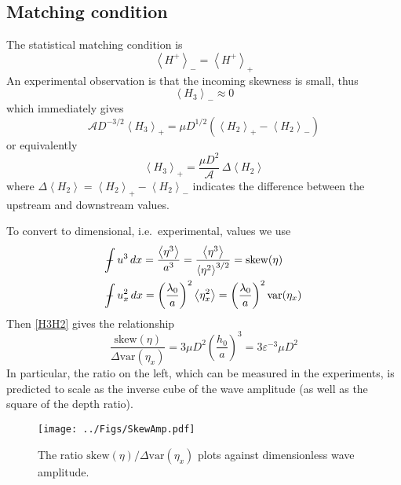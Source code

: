 \documentclass[11pt]{article}
\newcommand{\mean}[1]{\left< #1 \right>}
\newcommand{\eps}{\varepsilon}
\newcommand{\skw}{\text{skew}}
\newcommand{\var}{\text{var}}
\newcommand{\ampp}{\mathcal{A}}
\newcommand{\Ham}{H}
\newcommand{\Hp}{\Ham^{+}}
\newcommand{\meanup}[1]{\mean{#1}_{-}}
\newcommand{\meandn}[1]{\mean{#1}_{+}}
\def\Xint#1{\mathchoice
   {\XXint\displaystyle\textstyle{#1}}%
   {\XXint\textstyle\scriptstyle{#1}}%
   {\XXint\scriptstyle\scriptscriptstyle{#1}}%
   {\XXint\scriptscriptstyle\scriptscriptstyle{#1}}%
   \!\int}
\def\XXint#1#2#3{{\setbox0=\hbox{$#1{#2#3}{\int}$}
     \vcenter{\hbox{$#2#3$}}\kern-.5\wd0}}
\def\dashint{\Xint-}
\newcommand{\intt}{\dashint}%
\newcommand{\dx}{\, dx}
\begin{document}
\subsection{Matching condition}

The statistical matching condition is
\begin{equation}
\meanup{\Hp} = \meandn{\Hp}
\end{equation}
An experimental observation is that the incoming skewness is small, thus
\begin{equation}
\meanup{H_3} \approx 0
\end{equation}
which immediately gives
\begin{equation}
\ampp D^{-3/2} \meandn{H_3} = \mu D^{1/2} \left( \meandn{H_2} - \meanup{H_2} \right)
\end{equation}
or equivalently
\begin{equation}
\label{H3H2}
\meandn{H_3} = \frac{\mu D^{2}}{\ampp} \, \Delta \mean{H_2}
\end{equation}
where $\Delta \mean{H_2} =  \meandn{H_2} - \meanup{H_2}$  indicates the difference between the upstream and downstream values.

To convert to dimensional, i.e.~experimental, values we use
\begin{align}
& \intt u^3 \dx = \frac{\mean{\eta^3}}{a^3} = 
\frac{\mean{\eta^3}}{\mean{\eta^2}^{3/2}} = \skw(\eta) \\
& \intt u_x^2 \dx = \left(\frac{\lambda_0}{a} \right)^2 \mean{\eta_x^2} 
= \left(\frac{\lambda_0}{a} \right)^2 \var(\eta_x)
\end{align}
Then \eqref{H3H2} gives the relationship
\begin{equation}
\frac{\skw(\eta)}{\Delta \var(\eta_x)} =
3 \mu D^2 \left( \frac{h_0}{a} \right)^3 = 3 \eps^{-3} \mu D^2
\end{equation}
In particular, the ratio on the left, which can be measured in the experiments, is predicted to scale as the inverse cube of the wave amplitude (as well as the square of the depth ratio).

\begin{figure}%
\begin{center}
\texttt{[image: ../Figs/SkewAmp.pdf]}
\caption{\label{fig1} 
The ratio ${\skw(\eta)}/{\Delta \var(\eta_x)}$ plots against dimensionless wave amplitude.
}
\end{center}
\end{figure}
\end{document}
